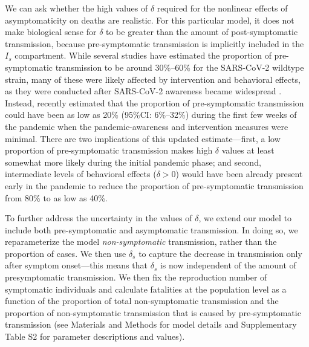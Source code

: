 \documentclass[12pt]{article}
\begin{document}
We can ask whether the high values of $\delta$ required for the nonlinear effects of asymptomaticity on deaths are realistic.
For this particular model, it does not make biological sense for $\delta$ to be greater than the amount of post-symptomatic transmission, because pre-symptomatic transmission is implicitly included in the $I_s$ compartment.
While several studies have estimated the proportion of pre-symptomatic transmission to be around 30\%--60\% for the SARS-CoV-2 wildtype strain, many of these were likely affected by intervention and behavioral effects, as they were conducted after SARS-CoV-2 awareness became widespread \cite{he2020temporal}.
Instead, \cite{sender2021unmitigated} recently estimated that the proportion of pre-symptomatic transmission could have been as low as 20\% (95\%CI: 6\%--32\%) during the first few weeks of the pandemic when the pandemic-awareness and intervention measures were minimal.
There are two implications of this updated estimate---first, a low proportion of pre-symptomatic transmission makes high $\delta$ values at least somewhat more likely during the initial pandemic phase; and second, intermediate levels of behavioral effects ($\delta > 0$) would have been already present early in the pandemic to reduce the proportion of pre-symptomatic transmission from 80\% to as low as 40\%.

To further address the uncertainty in the values of $\delta$, we extend our model to include both pre-symptomatic and asymptomatic transmission.
In doing so, we reparameterize the model \textit{non-symptomatic} transmission, rather than the proportion of cases.
We then use $\delta_s$ to capture the decrease in transmission only after symptom onset---this means that $\delta_s$ is now independent of the amount of presymptomatic transmission.
We then fix the reproduction number of symptomatic individuals and calculate fatalities at the population level as a function of the proportion of total non-symptomatic transmission and the proportion of non-symptomatic transmission that is caused by pre-symptomatic transmission (see Materials and Methods for model details and Supplementary Table S2 for parameter descriptions and values).
\end{document}
